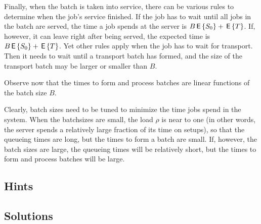 Finally, when the batch is taken into service, there can be various rules to determine when the job's service finished. If the job has to wait until all jobs in the batch are served, the time a job spends at the server is $B \,\mathsf{E}\left\{S_0\right\} + \,\mathsf{E}\left\{T\right\}$. If, however, it can leave right after being served, the expected time is $B \,\mathsf{E}\left\{S_0\right\} + \,\mathsf{E}\left\{T\right\}$. Yet other rules apply when the job has to wait for transport. Then it needs to wait until a transport batch has formed, and the size of the transport batch may be larger or smaller than $B$. 

Observe now that the times to form and process batches are linear functions of the batch size $B$. 

Clearly, batch sizes need to be tuned to minimize the time jobs spend in the system. When the batchsizes are small, the load $\rho$ is near to one (in other words, the server spends a relatively large fraction of its time on setups), so that the queueing times are long, but the times to form a batch are small. If, however, the batch sizes are large, the queueing times will be relatively short, but the times to form and process batches will be large. 



\subsection*{Hints}

\subsection*{Solutions}

\clearpage

